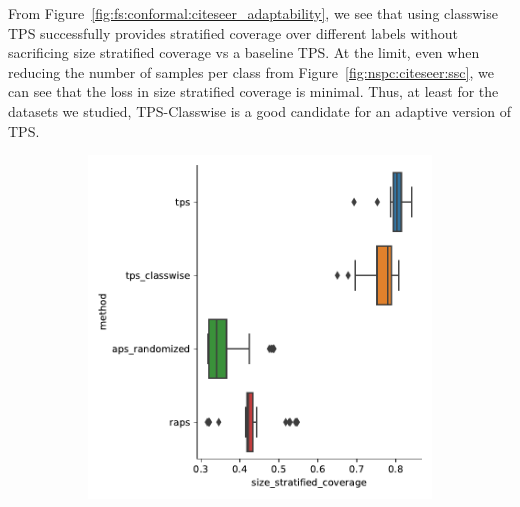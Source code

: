 From Figure~\ref{fig:fs:conformal:citeseer_adaptability}, we see that using classwise TPS successfully provides stratified coverage over different labels without sacrificing size stratified coverage vs a baseline TPS.
At the limit, even when reducing the number of samples per class from Figure~\ref{fig:nspc:citeseer:ssc}, we can see that the loss in size stratified coverage is minimal.
Thus, at least for the datasets we studied, TPS-Classwise is a good candidate for an adaptive version of TPS.
\begin{figure}
    \begin{subfigure}{0.48\linewidth}
        \includegraphics[width=\linewidth]{graphConformal/figures/nspc/citeseer_nspc_10_size_stratified_coverage}
    \end{subfigure}
    \begin{subfigure}{0.48\linewidth}

\end{subfigure}
\end{figure}

